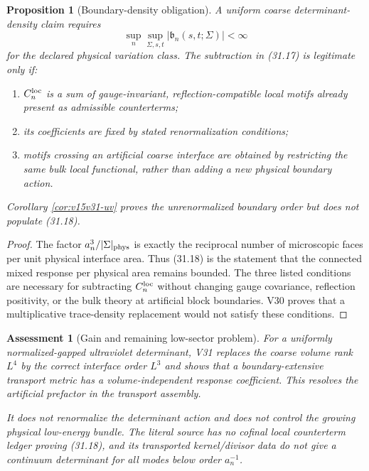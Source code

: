 \documentclass[11pt]{article}
\newtheorem{proposition}[theorem]{Proposition}
\newtheorem{assessment}[theorem]{Assessment}
\theoremstyle{remark}
\begin{document}
\begin{proposition}[Boundary-density obligation]
\label{prop:v15v31-counterterm}
A uniform coarse determinant-density claim requires
\[
 \sup_n\sup_{\Sigma,s,t}
 |{\mathfrak b}_n(s,t;\Sigma)|<\infty                      \tag{31.18}
\]
for the declared physical variation class.  The subtraction in
(31.17) is legitimate only if:
\begin{enumerate}
\item \(C_n^{\rm loc}\) is a sum of gauge-invariant,
      reflection-compatible local motifs already present as
      admissible counterterms;
\item its coefficients are fixed by stated renormalization
      conditions;
\item motifs crossing an artificial coarse interface are obtained
      by restricting the same bulk local functional, rather than
      adding a new physical boundary action.
\end{enumerate}
Corollary \ref{cor:v15v31-uv} proves the unrenormalized
boundary order but does not populate (31.18).
\end{proposition}

\begin{proof}
The factor \(a_n^3/|\Sigma|_{\rm phys}\) is exactly the reciprocal
number of microscopic faces per unit physical interface area.
Thus (31.18) is the statement that the connected mixed response per
physical area remains bounded.  The three listed conditions are
necessary for subtracting \(C_n^{\rm loc}\) without changing gauge
covariance, reflection positivity, or the bulk theory at artificial
block boundaries.  V30 proves that a multiplicative trace-density
replacement would not satisfy these conditions.
\end{proof}

\begin{assessment}[Gain and remaining low-sector problem]
\label{ass:v15v31-reading}
For a uniformly normalized-gapped ultraviolet determinant, V31
replaces the coarse volume rank \(L^4\) by the correct interface
order \(L^3\) and shows that a boundary-extensive transport metric
has a volume-independent response coefficient.  This resolves the
artificial prefactor in the transport assembly.

It does not renormalize the determinant action and does not control
the growing physical low-energy bundle.  The literal source has no
cofinal local counterterm ledger proving (31.18), and its transported
kernel/divisor data do not give a continuum determinant for all
modes below order \(a_n^{-1}\).
\end{assessment}
\end{document}
